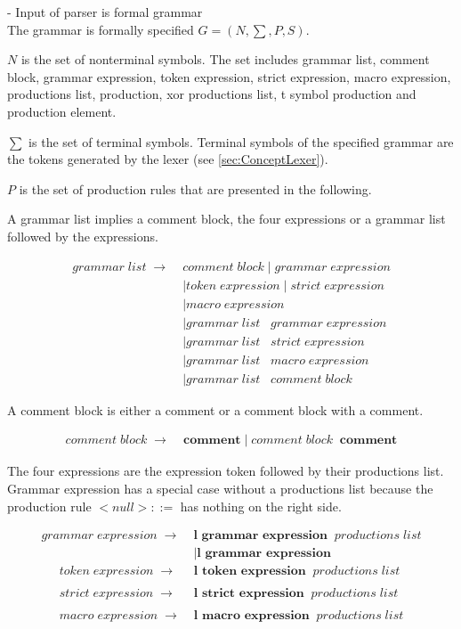 - Input of parser is formal grammar \\

The grammar is formally specified $G = (N,\sum,P,S)$.

$N$ is the set of nonterminal symbols. The set includes grammar list, comment block, grammar expression, token expression, strict expression, macro expression, productions list, production, xor productions list, t symbol production and production element.

$\sum$ is the set of terminal symbols. Terminal symbols of the specified grammar are the tokens generated by the lexer (see \ref{sec:ConceptLexer}).

$P$ is the set of production rules that are presented in the following. 

A grammar list implies a comment block, the four expressions or a grammar list followed by the expressions.

\begin{align*}
	grammar\;list\; \rightarrow\; &comment\;block
	     		\mid grammar\;expression  \\
			   &\mid token\;expression
                \mid strict\;expression\\
               &\mid macro\;expression \\
               &\mid grammar\;list\;\;\;grammar\;expression\\
               &\mid grammar\;list\;\;\;strict\;expression \\
               &\mid grammar\;list\;\;\;macro\;expression \\
               &\mid grammar\;list\;\;\;comment\;block               
\end{align*}

A comment block is either a comment or a comment block with a comment.

\begin{align*}
    comment\;block\; \rightarrow\; &\textbf{comment}
                \mid comment\;block\;\;\textbf{comment}
\end{align*}

The four expressions are the expression token followed by their productions list. Grammar expression has a special case without a productions list because the production rule $ <null> ::= $ has nothing on the right side. 

\begin{align*}
	grammar\;expression\; \rightarrow\; &\textbf{l grammar expression}\;\;productions\;list \\ 
               &\mid \textbf{l grammar expression} 
\end{align*}
\begin{align*}        
	token\;expression\; \rightarrow\; &\textbf{l token expression} \;\;productions\;list \\ \\
	strict\;expression\; \rightarrow\; &\textbf{l strict expression} \;\;productions\;list \\ \\
	macro\;expression\; \rightarrow\; &\textbf{l macro expression} \;\;productions\;list 
\end{align*}

